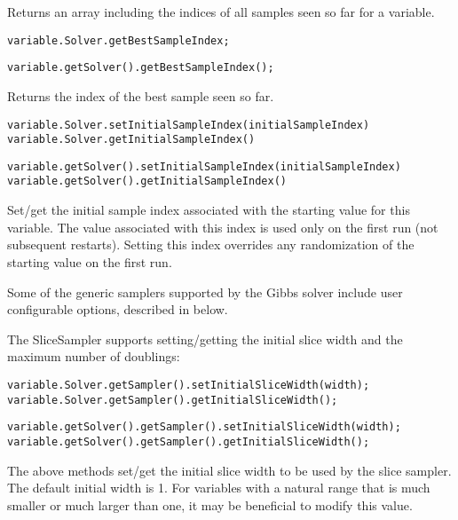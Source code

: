 Returns an array including the indices of all samples seen so far for a variable.

\ifmatlab
\begin{lstlisting}
variable.Solver.getBestSampleIndex;
\end{lstlisting}
\fi

\ifjava
\begin{lstlisting}
variable.getSolver().getBestSampleIndex();
\end{lstlisting}
\fi

Returns the index of the best sample seen so far.


\ifmatlab
\begin{lstlisting}
variable.Solver.setInitialSampleIndex(initialSampleIndex)
variable.Solver.getInitialSampleIndex()
\end{lstlisting}
\fi

\ifjava
\begin{lstlisting}
variable.getSolver().setInitialSampleIndex(initialSampleIndex)
variable.getSolver().getInitialSampleIndex()
\end{lstlisting}
\fi

Set/get the initial sample index associated with the starting value for this variable.  The value associated with this index is used only on the first run (not subsequent restarts).  Setting this index overrides any randomization of the starting value on the first run.



Some of the generic samplers supported by the Gibbs solver include user configurable options, described in below.

The SliceSampler supports setting/getting the initial slice width and the maximum number of doublings:

\ifmatlab
\begin{lstlisting}
variable.Solver.getSampler().setInitialSliceWidth(width);
variable.Solver.getSampler().getInitialSliceWidth();
\end{lstlisting}
\fi

\ifjava
\begin{lstlisting}
variable.getSolver().getSampler().setInitialSliceWidth(width);
variable.getSolver().getSampler().getInitialSliceWidth();
\end{lstlisting}
\fi

The above methods set/get the initial slice width to be used by the slice sampler.  The default initial width is 1.  For variables with a natural range that is much smaller or much larger than one, it may be beneficial to modify this value.

